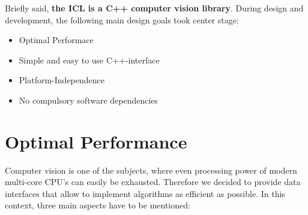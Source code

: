 Briefly said, \textbf{the ICL is a C++ computer vision library}. During design and development, the following main design goals took center stage: 
\begin{itemize}
\item Optimal Performace
\item Simple and easy to use C++-interface
\item Platform-Independence 
\item No compulsory software dependencies
\end{itemize}


\section{Optimal Performance\label{sec:optimal-performace}} 
Computer vision is one of the subjects, where even processing power of modern multi-core CPU's can easily be exhausted. Therefore we decided to provide data interfaces that allow to implement algorithms as efficient as possible. In this context, three main aspects have to be mentioned:

